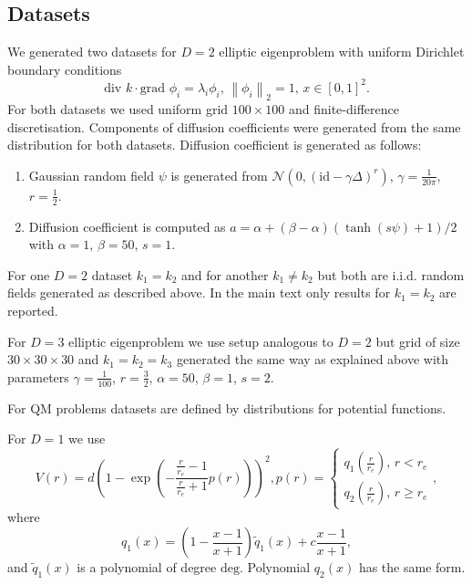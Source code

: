 \documentclass{article}
\begin{document}
\subsection{Datasets}
\label{subsection:appendix:elliptic_datasets}
We generated two datasets for $D=2$ elliptic eigenproblem with uniform Dirichlet boundary conditions
\begin{equation}
	\label{eq:elliptic_eigenproblem_2d}
	\text{div } k\cdot\text{grad }\phi_i = \lambda_i \phi_i,\,\left\|\phi_i\right\|_{2} = 1,\,x\in[0,1]^2.
\end{equation}
For both datasets we used uniform grid $100\times100$ and finite-difference discretisation. Components of diffusion coefficients were generated from the same distribution for both datasets. Diffusion coefficient is generated as follows:
\begin{enumerate}
	\item Gaussian random field $\psi$ is generated from $\mathcal{N}\left(0, \left(\text{id} - \gamma\Delta\right)^{r}\right)$, $\gamma = \frac{1}{20 \pi}$, $r=\frac{1}{2}$.
	\item Diffusion coefficient is computed as $a = \alpha + (\beta - \alpha)\left(\tanh\left(s \psi \right) + 1\right)/2$ with $\alpha = 1$, $\beta = 50$, $s = 1$.
\end{enumerate}
For one $D=2$ dataset $k_1 = k_2$ and for another $k_1 \neq k_2$ but both are i.i.d. random fields generated as described above. In the main text only results for $k_1 = k_2$ are reported.

For $D=3$ elliptic eigenproblem we use setup analogous to $D=2$ but grid of size $30\times30\times30$ and $k_1 = k_2 = k_3$ generated the same way as explained above with parameters $\gamma = \frac{1}{100}$, $r = \frac{3}{2}$, $\alpha = 50$, $\beta = 1$, $s = 2$.

For QM problems datasets are defined by distributions for potential functions.

For $D=1$ we use
\begin{equation}
	V(r) = d \left(1 - \exp\left(-\frac{\frac{r}{r_e} - 1}{\frac{r}{r_e} + 1} p\left(r\right)\right)\right)^2, p(r) = \begin{cases}q_1\left(\frac{r}{r_e}\right),\,r < r_e\\q_2\left(\frac{r}{r_e}\right),\,r \geq r_e\end{cases},
\end{equation}
where 
\begin{equation}
	q_{1}(x) = \left(1 - \frac{x - 1}{x + 1}\right) \widetilde{q}_1(x) + c \frac{x - 1}{x + 1},
\end{equation}
and  $\widetilde{q}_1(x)$ is a polynomial of degree $\text{deg}$.  Polynomial $q_2(x)$ has the same form.
\end{document}
